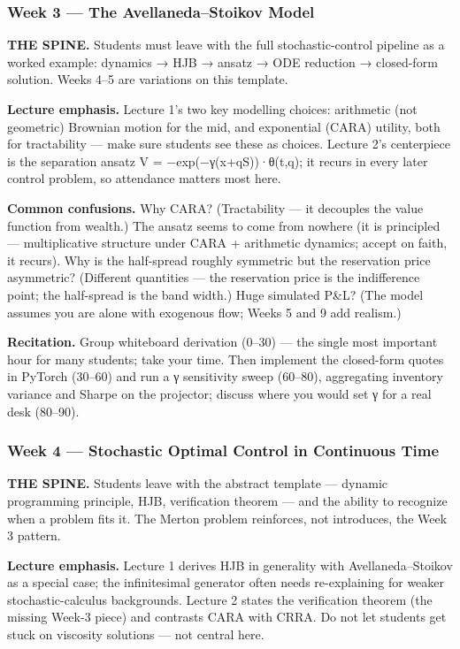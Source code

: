 \documentclass[
]{article}
\begin{document}
\subsubsection{Week 3 --- The Avellaneda--Stoikov
Model}\label{week-3-the-avellanedastoikov-model}

\textbf{THE SPINE.} Students must leave with the full stochastic-control
pipeline as a worked example: dynamics → HJB → ansatz → ODE reduction →
closed-form solution. Weeks 4--5 are variations on this template.

\textbf{Lecture emphasis.} Lecture 1's two key modelling choices:
arithmetic (not geometric) Brownian motion for the mid, and exponential
(CARA) utility, both for tractability --- make sure students see these
as choices. Lecture 2's centerpiece is the separation ansatz V =
−exp(−γ(x+qS))·θ(t,q); it recurs in every later control problem, so
attendance matters most here.

\textbf{Common confusions.} Why CARA? (Tractability --- it decouples the
value function from wealth.) The ansatz seems to come from nowhere (it
is principled --- multiplicative structure under CARA + arithmetic
dynamics; accept on faith, it recurs). Why is the half-spread roughly
symmetric but the reservation price asymmetric? (Different quantities
--- the reservation price is the indifference point; the half-spread is
the band width.) Huge simulated P\&L? (The model assumes you are alone
with exogenous flow; Weeks 5 and 9 add realism.)

\textbf{Recitation.} Group whiteboard derivation (0--30) --- the single
most important hour for many students; take your time. Then implement
the closed-form quotes in PyTorch (30--60) and run a γ sensitivity sweep
(60--80), aggregating inventory variance and Sharpe on the projector;
discuss where you would set γ for a real desk (80--90).

\subsubsection{Week 4 --- Stochastic Optimal Control in Continuous
Time}\label{week-4-stochastic-optimal-control-in-continuous-time}

\textbf{THE SPINE.} Students leave with the abstract template ---
dynamic programming principle, HJB, verification theorem --- and the
ability to recognize when a problem fits it. The Merton problem
reinforces, not introduces, the Week 3 pattern.

\textbf{Lecture emphasis.} Lecture 1 derives HJB in generality with
Avellaneda--Stoikov as a special case; the infinitesimal generator often
needs re-explaining for weaker stochastic-calculus backgrounds. Lecture
2 states the verification theorem (the missing Week-3 piece) and
contrasts CARA with CRRA. Do not let students get stuck on viscosity
solutions --- not central here.
\end{document}

